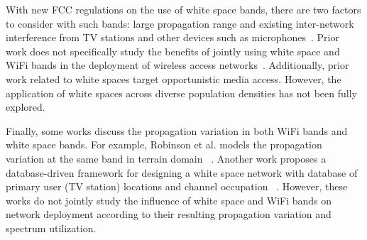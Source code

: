 With new FCC regulations on the use of white space bands, there are 
two factors to consider with such bands: large propagation range 
and existing inter-network interference from TV stations and other 
devices such as microphones~\cite{fccwhitespace,cui2013leveraging,bahl2009white}.
Prior work does not specifically study the benefits of jointly 
using white space and WiFi bands in the deployment of wireless access 
networks~\cite{akyildiz2005wireless}. Additionally, prior work related 
to white spaces target opportunistic media access. However, the 
application of white spaces across diverse population densities 
has not been fully explored.

Finally, some works discuss the propagation variation in both WiFi 
bands and white space bands. For example, Robinson et al. models 
the propagation variation at the same band in terrain domain
~\cite{robinson2010deploying}. Another work proposes a database-driven 
framework for designing a white space network with database of 
primary user (TV station) locations and channel occupation
~\cite{murty2012senseless}. However, these works do not jointly study 
the influence of white space and WiFi bands on network deployment 
according to their resulting propagation variation and spectrum utilization.




